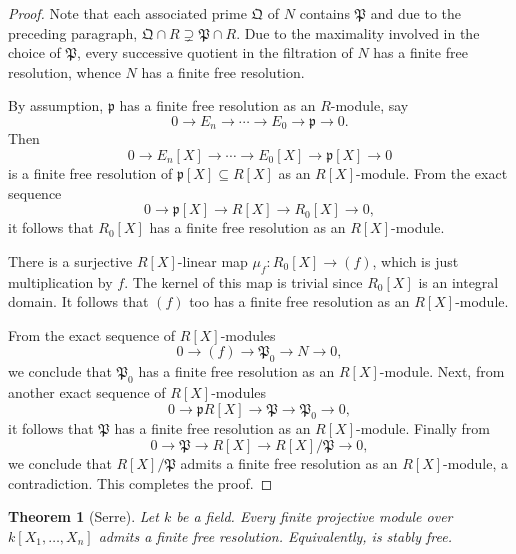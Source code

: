\documentclass[12pt]{article}
\theoremstyle{thmstyle}
\newtheorem{theorem}{Theorem}[section]
\theoremstyle{defstyle}
\newcommand{\frakp}{\mathfrak{p}} %
\newcommand{\frakP}{\mathfrak{P}} %
\newcommand{\frakQ}{\mathfrak{Q}} %
\begin{document}
\begin{proof}
    Note that each associated prime $\frakQ$ of $N$ contains $\frakP$ and due to the preceding paragraph, $\frakQ\cap R\supsetneq\frakP\cap R$. Due to the maximality involved in the choice of $\frakP$, every successive quotient in the filtration of $N$ has a finite free resolution, whence $N$ has a finite free resolution.

    By assumption, $\frakp$ has a finite free resolution as an $R$-module, say 
    \begin{equation*}
        0\to E_n\to\cdots\to E_0\to\frakp\to 0.
    \end{equation*}
    Then 
    \begin{equation*}
        0\to E_n[X]\to\cdots\to E_0[X]\to\frakp[X]\to 0
    \end{equation*}
    is a finite free resolution of $\frakp[X]\subseteq R[X]$ as an $R[X]$-module. From the exact sequence 
    \begin{equation*}
        0\to\frakp[X]\to R[X]\to R_0[X]\to 0,
    \end{equation*}
    it follows that $R_0[X]$ has a finite free resolution as an $R[X]$-module.

    There is a surjective $R[X]$-linear map $\mu_f: R_0[X]\to (f)$, which is just multiplication by $f$. The kernel of this map is trivial since $R_0[X]$ is an integral domain. It follows that $(f)$ too has a finite free resolution as an $R[X]$-module. 

    From the exact sequence of $R[X]$-modules
    \begin{equation*}
        0\to (f)\to\frakP_0\to N\to 0,
    \end{equation*}
    we conclude that $\frakP_0$ has a finite free resolution as an $R[X]$-module. Next, from another exact sequence of $R[X]$-modules
    \begin{equation*}
        0\to\frakp R[X]\to\frakP\to\frakP_0\to 0,
    \end{equation*}
    it follows that $\frakP$ has a finite free resolution as an $R[X]$-module. Finally from 
    \begin{equation*}
        0\to\frakP\to R[X]\to R[X]/\frakP\to 0,
    \end{equation*}
    we conclude that $R[X]/\frakP$ admits a finite free resolution as an $R[X]$-module, a contradiction. This completes the proof.
\end{proof}

\begin{theorem}[Serre]
    Let $k$ be a field. Every finite projective module over $k[X_1,\dots, X_n]$ admits a finite free resolution. Equivalently, is stably free.
\end{theorem}
\end{document}
